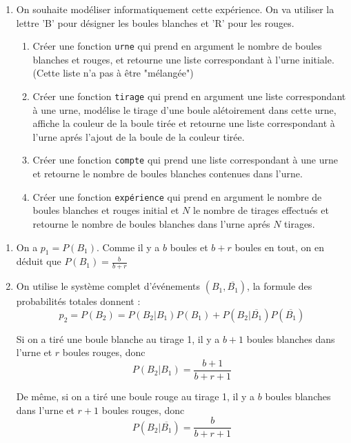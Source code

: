 \documentclass[a4paper, 11pt,reqno]{article}
\begin{document}
\begin{exercice}
\begin{enumerate}
\item On souhaite modéliser informatiquement cette expérience. On va utiliser la lettre 'B' pour désigner les boules blanches et 'R' pour les rouges. 
\begin{enumerate}
\item Créer une fonction \texttt{urne} qui prend en argument le nombre de boules blanches et rouges, et retourne une liste correspondant à l'urne initiale. (Cette  liste n'a pas à être "mélangée")
\item Créer une fonction \texttt{tirage} qui prend en argument une liste correspondant à une urne, modélise le tirage d'une boule alétoirement dans cette urne, affiche la couleur de la boule tirée et retourne une liste correspondant à l'urne aprés l'ajout de la boule de la couleur tirée. 
\item Créer une fonction \texttt{compte} qui prend une liste correspondant à une urne et retourne   le nombre de  boules blanches  contenues dans l'urne. 
\item Créer une fonction \texttt{expérience} qui prend en argument le nombre de boules blanches et rouges initial et $N$ le nombre de tirages effectués et retourne le nombre de boules blanches dans l'urne aprés $N$ tirages. 
\end{enumerate}
 
\end{enumerate}
\begin{correction}
\begin{enumerate}


\item On a $p_1=P(B_1)$. Comme il y a $b$ boules et $b+r$ boules en tout, on en déduit que $P(B_1) =\frac{b}{b+r}$ 

\item On utilise le système complet d'événements $(B_1, \overline{B_1})$, la formule des probabilités totales donnent : 
$$p_2=P(B_2) =P(B_2|B_1) P(B_1) +P(B_2 |\overline{B_1})P(\overline{B_1})$$

Si on a tiré une boule blanche au tirage 1, il y a $b+1$ boules blanches dans l'urne et $r$ boules rouges, donc 
$$P(B_2|B_1)  =\frac{b+1}{b+r+1}$$

De même, si on a tiré une boule rouge au tirage 1, il y a $b$ boules blanches dans l'urne et $r+1$ boules rouges, donc 
$$P(B_2|\overline{B_1})  =\frac{b}{b+r+1}$$


\end{enumerate}
\end{correction}
\end{exercice}
\end{document}
